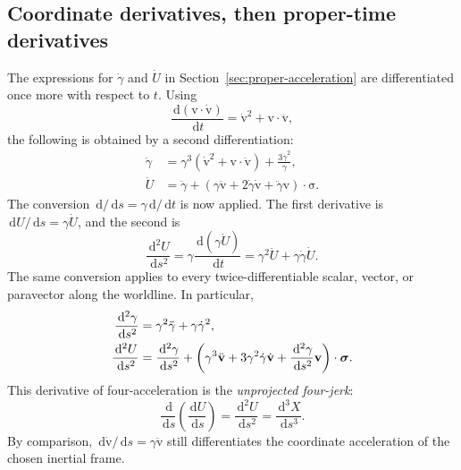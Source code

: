 \documentclass[11pt]{article}
\newcommand{\pv}[1]{{#1}}
\newcommand{\vstyle}[1]{{\bm{\mathrm{#1}}}}
\newcommand{\pU}{\pv{U}}
\newcommand{\pX}{\pv{X}}
\numberwithin{equation}{section}
\newcommand{\dotprod}{\cdot}
\newcommand{\bsig}{\vstyle{\sigma}}
\newcommand{\bv}{\vstyle{v}}
\newcommand{\dd}{\,\mathrm d}
\begin{document}
\subsection{Coordinate derivatives, then proper-time derivatives}
The expressions for $\dot{\gamma}$ and $\dot{\pU}$ in
Section~\ref{sec:proper-acceleration} are differentiated once more with respect to $t$.
Using
\[
 \frac{\dd(\bv\dotprod\dot{\bv})}{\dd t}
 =\dot{\bv}^2+\bv\dotprod\ddot{\bv},
\]
the following is obtained by a second differentiation:
\begin{align*}
 \ddot{\gamma}
 &=\gamma^3(\dot{\bv}^2+\bv\dotprod\ddot{\bv})
   +\frac{3\dot{\gamma}^2}{\gamma},\\
 \ddot{\pU}
 &=\ddot{\gamma}
 +(\gamma\ddot{\bv}+2\dot{\gamma}\dot{\bv}
       +\ddot{\gamma}\bv)\dotprod\bsig.
\end{align*}
The conversion $\dd/\dd s=\gamma\dd/\dd t$ is now applied. The first derivative is
$\dd\pU/\dd s=\gamma\dot{\pU}$, and the second is
\begin{equation}
 \frac{\dd^2\pU}{\dd s^2}
 =\gamma\frac{\dd(\gamma\dot{\pU})}{\dd t}
 =\gamma^2\ddot{\pU}+\gamma\dot{\gamma}\dot{\pU}.
 \label{eq:jerk-time-conversion}
\end{equation}
The same conversion applies to every twice-differentiable scalar, vector,
or paravector along the worldline. In particular,
\begin{align}
 \frac{\dd^2\gamma}{\dd s^2}
 &=\gamma^2\ddot{\gamma}+\gamma\dot{\gamma}^2,\notag\\
 \frac{\dd^2\pU}{\dd s^2}
 &=\frac{\dd^2\gamma}{\dd s^2}+
 \left(\gamma^3\ddot{\bv}+3\gamma^2\dot{\gamma}\dot{\bv}
 +\frac{\dd^2\gamma}{\dd s^2}\bv\right)\dotprod\bsig.
 \label{eq:four-jerk-components}
\end{align}
This derivative of four-acceleration is the \emph{unprojected four-jerk}:
\begin{equation}
 \frac{\dd}{\dd s}\left(\frac{\dd\pU}{\dd s}\right)
 =\frac{\dd^2\pU}{\dd s^2}
 =\frac{\dd^3\pX}{\dd s^3}.
 \label{eq:four-jerk-definition}
\end{equation}
By comparison, $\dd\dot{\bv}/\dd s=\gamma\ddot{\bv}$ still differentiates
the coordinate acceleration of the chosen inertial frame.
\end{document}

